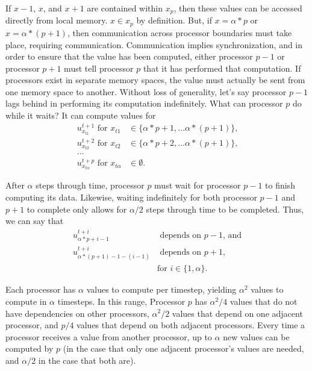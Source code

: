 If $x-1$, $x$, and $x+1$ are contained within $x_p$, then these values can be
accessed directly from local memory. $x \in x_p$ by definition. But, if $x =
\alpha*p$ or $x = \alpha*(p+1)$, then communication across processor boundaries
must take place, requiring communication. Communication implies synchronization,
and in order to ensure that the value has been computed, either processor $p-1$
or processor $p+1$ must tell processor $p$ that it has performed that
computation. If processors exist in separate memory spaces, the value must
actually be sent from one memory space to another. Without loss of generality,
let's say processor $p-1$ lags behind in performing its computation
indefinitely. What can processor $p$ do while it waits? It can compute values
for
\begin{align*} 
    u^{t+1}_{x_{t1}} \text{ for } x_{t1} &\in \{ \alpha*p + 1, \dots \alpha*(p+1) \} \text{,} \\
    u^{t+2}_{x_{t2}} \text{ for } x_{t2} &\in \{ \alpha*p + 2, \dots \alpha*(p+1) \} \text{,} \\
    ... \\
    u^{t+p}_{x_{t\alpha}} \text{ for } x_{t\alpha} &\in \emptyset \text{.}
\end{align*}

After $\alpha$ steps through time, processor $p$ must wait for processor $p-1$ to
finish computing its data. Likewise, waiting indefinitely for both processor
$p-1$ and $p+1$ to complete only allows for $\alpha / 2$ steps through time to be
completed. Thus, we can say that
\begin{align*}
    u^{t + i}_{\alpha*p + i-1} &\text{ depends on } p-1 \text{, and} \\
    u^{t + i}_{\alpha*(p+1)-1 - (i-1)} &\text{ depends on } p+1 \text{,} \\
                                       &\text{for } i \in \{ 1, \alpha \} \text{.}
\end{align*}

Each processor has $\alpha$ values to compute per timestep, yielding $\alpha^2$
values to compute in $\alpha$ timesteps. In this range, Processor $p$ has
$\alpha^2/4$ values that do not have dependencies on other processors,
$\alpha^2/2$ values that depend on one adjacent processor, and $p/4$ values that
depend on both adjacent processors. Every time a processor receives a value from
another processor, up to $\alpha$ new values can be computed by $p$ (in the case
that only one adjacent processor's values are needed, and $\alpha/2$ in the case
that both are).

